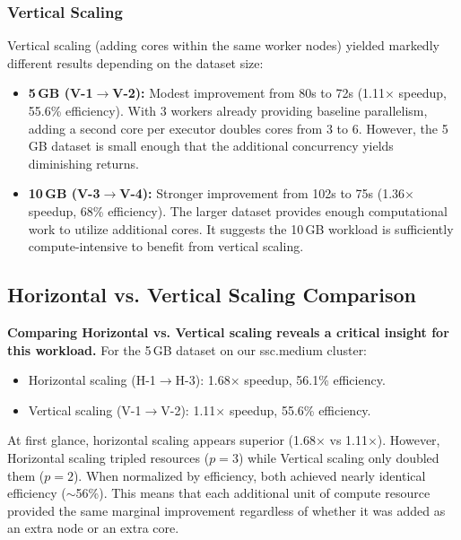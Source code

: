\subsubsection{Vertical Scaling}

Vertical scaling (adding cores within the same worker nodes) yielded markedly different results depending on the dataset size:

\begin{itemize}
    \item \textbf{5\,GB (V-1$\to$V-2):} Modest improvement from 80s to 72s (1.11$\times$ speedup, 55.6\% efficiency). With 3 workers already providing baseline parallelism, adding a second core per executor doubles cores from 3 to 6. However, the 5\,GB dataset is small enough that the additional concurrency yields diminishing returns.
    \item \textbf{10\,GB (V-3$\to$V-4):} Stronger improvement from 102s to 75s (1.36$\times$ speedup, 68\% efficiency). The larger dataset provides enough computational work to utilize additional cores. It suggests the 10\,GB workload is sufficiently compute-intensive to benefit from vertical scaling.
\end{itemize}

\subsection{Horizontal vs. Vertical Scaling Comparison}

\textbf{Comparing Horizontal vs. Vertical scaling reveals a critical insight for this workload.} 
For the 5\,GB dataset on our ssc.medium cluster:

\begin{itemize}
    \item Horizontal scaling (H-1$\to$H-3): 1.68$\times$ speedup, 56.1\% efficiency.
    \item Vertical scaling (V-1$\to$V-2): 1.11$\times$ speedup, 55.6\% efficiency.
\end{itemize}

At first glance, horizontal scaling appears superior (1.68$\times$ vs 1.11$\times$). However, Horizontal scaling tripled resources ($p=3$) while Vertical scaling only doubled them ($p=2$). When normalized by efficiency, both achieved nearly identical efficiency ($\sim$56\%). This means that each additional unit of compute resource provided the same marginal improvement regardless of whether it was added as an extra node or an extra core.


